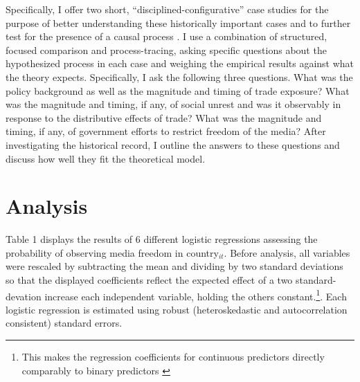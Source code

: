 \documentclass[a4paper]{article}\usepackage[]{graphicx}\usepackage[]{color}
\begin{document}
Specifically, I offer two short, “disciplined-configurative” case studies for the purpose of better understanding these historically important cases and to further test for the presence of a causal process \parencite[75]{george2005case}. I use a combination of structured, focused comparison and process-tracing, asking specific questions about the hypothesized process in each case and weighing the empirical results against what the theory expects. Specifically, I ask the following three questions. What was the policy background as well as the magnitude and timing of trade exposure? What was the magnitude and timing, if any, of social unrest and was it observably in response to the distributive effects of trade? What was the magnitude and timing, if any, of government efforts to restrict freedom of the media? After investigating the historical record, I outline the answers to these questions and discuss how well they fit the theoretical model.

\section{Analysis}

Table 1 displays the results of 6 different logistic regressions assessing the probability of observing media freedom in country$_{it}$. Before analysis, all variables were rescaled by subtracting the mean and dividing by two standard deviations so that the displayed coefficients reflect the expected effect of a two standard-devation increase each independent variable, holding the others constant.\footnote{This makes the regression coefficients for continuous predictors directly comparably to binary predictors \parencite{Gelman:2008gz}}. Each logistic regression is estimated using robust (heteroskedastic and autocorrelation consistent) standard errors.
\end{document}
